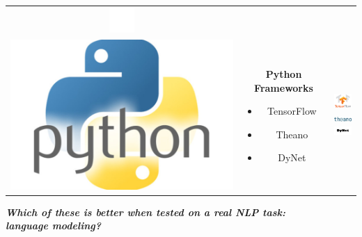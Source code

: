 \documentclass[paperwidth=118cm,paperheight=84cm,portrait,margin=8em,fontscale=0.3]{baposter}
\begin{document}
\begin{poster}
{\begin{tabular}{ccc}\hspace*{10pt}
\includegraphics[scale=.2]{graphics/pnt5in.png}\\
\includegraphics[width=.24\columnwidth]{graphics/python.jpg}
 & \parbox{0.35\textwidth}{
\vspace*{-40pt}\textbf{Python Frameworks}
\begin{itemize}\addtolength{\itemsep}{-0.5\baselineskip}
\item TensorFlow
\item Theano
\item DyNet
\vspace*{0pt}
\end{itemize}}
& \parbox{0.2\textwidth}{\vspace*{-40pt}
\includegraphics[width=40pt]{graphics/TensorFlow.png}\vspace*{3pt}\\
\includegraphics[width=40pt]{graphics/theano.jpeg}\vspace*{-1pt}\\
\includegraphics[width=40pt]{graphics/DyNet.pdf}
}
\end{tabular}
\begin{center}
\textbf{\textit{Which of these is better when tested on a real NLP task:\\ language modeling?}}
\end{center}
}


\end{poster}
\end{document}
